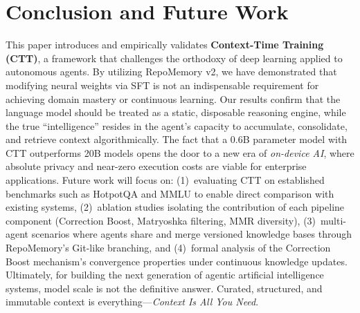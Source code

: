 \documentclass[conference]{IEEEtran}
\begin{document}
\section{Conclusion and Future Work}
This paper introduces and empirically validates \textbf{Context-Time Training (CTT)}, a framework that challenges the orthodoxy of deep learning applied to autonomous agents. By utilizing RepoMemory v2, we have demonstrated that modifying neural weights via SFT is not an indispensable requirement for achieving domain mastery or continuous learning.
Our results confirm that the language model should be treated as a static, disposable reasoning engine, while the true ``intelligence'' resides in the agent's capacity to accumulate, consolidate, and retrieve context algorithmically. The fact that a 0.6B parameter model with CTT outperforms 20B models opens the door to a new era of \emph{on-device AI}, where absolute privacy and near-zero execution costs are viable for enterprise applications.
Future work will focus on: (1)~evaluating CTT on established benchmarks such as HotpotQA and MMLU to enable direct comparison with existing systems, (2)~ablation studies isolating the contribution of each pipeline component (Correction Boost, Matryoshka filtering, MMR diversity), (3)~multi-agent scenarios where agents share and merge versioned knowledge bases through RepoMemory's Git-like branching, and (4)~formal analysis of the Correction Boost mechanism's convergence properties under continuous knowledge updates.
Ultimately, for building the next generation of agentic artificial intelligence systems, model scale is not the definitive answer. Curated, structured, and immutable context is everything---\emph{Context Is All You Need}.
\end{document}

